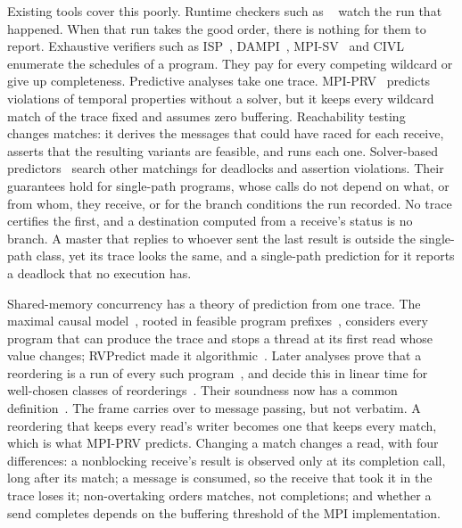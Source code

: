 Existing tools cover this poorly. Runtime checkers such as \MUST~\citep{hilbrich12must}
watch the run that happened. When that run takes the good order, there is nothing for them to
report. Exhaustive verifiers such as ISP~\citep{vakkalanka08isp},
DAMPI~\citep{vo10dampi}, MPI-SV~\citep{yu20mpisv} and CIVL~\citep{siegel15civl}
enumerate the schedules of a program. They pay for every competing wildcard or give up
completeness. Predictive analyses take one trace. MPI-PRV~\citep{yao26mpiprv} predicts
violations of temporal properties without a solver, but it keeps every wildcard
match of the trace fixed and assumes zero buffering. Reachability
testing~\citep{tai97race,lei06reachability} changes matches: it derives the messages that
could have raced for each receive, asserts that the resulting variants are feasible, and runs
each one. Solver-based predictors~\citep{huang13ase,forejt17mopper,huang20ase,khanna18hermes}
search other matchings for deadlocks and assertion violations. Their guarantees hold for
single-path programs, whose calls do not depend on what, or from whom, they receive, or for
the branch conditions the run recorded. No trace certifies the first, and a destination
computed from a receive's status is no branch. A master that replies to whoever sent the last
result is outside the single-path class, yet its trace looks the same, and a single-path
prediction for it reports a deadlock that no execution has.

Shared-memory concurrency has a theory of prediction from one trace. The maximal causal
model~\citep{serbanuta12mcm}, rooted in feasible program prefixes~\citep{netzer91accuracy},
considers every program that can produce the trace and stops a thread at its first read
whose value changes; RVPredict made it algorithmic~\citep{huang14rvpredict}. Later analyses
prove that a reordering is a run of every such program~\citep{smaragdakis12cp,mathur18shb},
and decide this in linear time for well-chosen classes of
reorderings~\citep{kini17wcp,mathur18shb,mathur21syncp,tunc23spd}. Their soundness now has a
common definition~\citep{liu25soundness}. The frame carries over to message passing, but
not verbatim. A reordering that keeps every read's writer becomes one that keeps every
match, which is what MPI-PRV predicts. Changing a match changes a read, with four
differences: a nonblocking receive's result is observed only at its completion call, long
after its match; a message is consumed, so the receive that took it in the trace loses it;
non-overtaking orders matches, not completions; and whether a send completes depends on the
buffering threshold of the MPI implementation.

